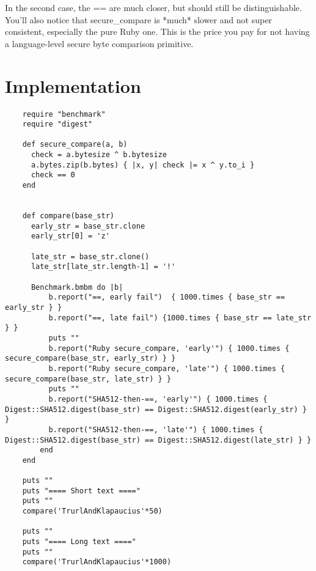 \documentclass{article}
\begin{document}
  In the second case, the == are much closer, but should still be distinguishable. \\

  You'll also notice that secure\_compare is *much* slower and not super consistent,
  especially the pure Ruby one. This is the price you pay for not having a language-level
  secure byte comparison primitive.

  \section{Implementation}

    \begin{lstlisting}
    require "benchmark"
    require "digest"

    def secure_compare(a, b)
      check = a.bytesize ^ b.bytesize
      a.bytes.zip(b.bytes) { |x, y| check |= x ^ y.to_i }
      check == 0
    end


    def compare(base_str)
      early_str = base_str.clone
      early_str[0] = 'z'

      late_str = base_str.clone()
      late_str[late_str.length-1] = '!'

      Benchmark.bmbm do |b|
          b.report("==, early fail")  { 1000.times { base_str == early_str } }
          b.report("==, late fail") {1000.times { base_str == late_str } }
          puts ""
          b.report("Ruby secure_compare, 'early'") { 1000.times { secure_compare(base_str, early_str) } }
          b.report("Ruby secure_compare, 'late'") { 1000.times { secure_compare(base_str, late_str) } }
          puts ""
          b.report("SHA512-then-==, 'early'") { 1000.times { Digest::SHA512.digest(base_str) == Digest::SHA512.digest(early_str) } }
          b.report("SHA512-then-==, 'late'") { 1000.times { Digest::SHA512.digest(base_str) == Digest::SHA512.digest(late_str) } }
        end
    end

    puts ""
    puts "==== Short text ===="
    puts ""
    compare('TrurlAndKlapaucius'*50)

    puts ""
    puts "==== Long text ===="
    puts ""
    compare('TrurlAndKlapaucius'*1000)
    \end{lstlisting}
\end{document}

